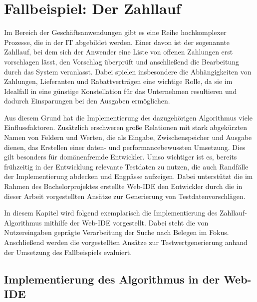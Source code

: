 \section{Fallbeispiel: Der Zahllauf}\label{chap:paymentrun}

Im Bereich der Geschäftsanwendungen gibt es eine Reihe hochkomplexer Prozesse, die in der IT abgebildet werden.
Einer davon ist der sogenannte Zahllauf, bei dem sich der Anwender eine Liste von offenen Zahlungen erst vorschlagen lässt, den Vorschlag überprüft und anschließend die Bearbeitung durch das System veranlasst.
Dabei spielen insbesondere die Abhängigkeiten von Zahlungen, Lieferanten und Rabattverträgen eine wichtige Rolle, da sie im Idealfall in eine günstige Konstellation für das Unternehmen resultieren und dadurch Einsparungen bei den Ausgaben ermöglichen.

Aus diesem Grund hat die Implementierung des dazugehörigen Algorithmus viele Einflussfaktoren.
Zusätzlich erschweren große Relationen mit stark abgekürzten Namen von Feldern und Werten, die als Eingabe, Zwischenspeicher und Ausgabe dienen, das Erstellen einer daten- und performancebewussten Umsetzung.
Dies gilt besonders für domänenfremde Entwickler.
Umso wichtiger ist es, bereits frühzeitig in der Entwicklung relevante Testdaten zu nutzen, die auch Randfälle der Implementierung abdecken und Engpässe aufzeigen.
Dabei unterstützt die im Rahmen des Bachelorprojektes erstellte Web-IDE den Entwickler durch die in dieser Arbeit vorgestellten Ansätze zur Generierung von Testdatenvorschlägen.

In diesem Kapitel wird folgend exemplarisch die Implementierung des Zahllauf-Algorithmus mithilfe der Web-IDE vorgestellt.
Dabei steht die von Nutzereingaben geprägte Verarbeitung der Suche nach Belegen im Fokus.
Anschließend werden die vorgestellten Ansätze zur Testwertgenerierung anhand der Umsetzung des Fallbeispiels evaluiert.

\subsection{Implementierung des Algorithmus in der Web-IDE}

